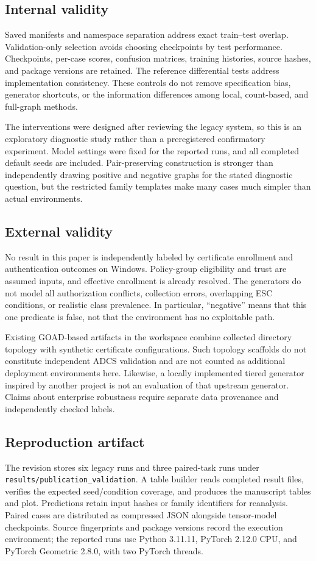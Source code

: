 \documentclass[journal]{IEEEtran}
\begin{document}
\subsection{Internal validity}
Saved manifests and namespace separation address exact train--test overlap. Validation-only selection avoids choosing checkpoints by test performance. Checkpoints, per-case scores, confusion matrices, training histories, source hashes, and package versions are retained. The reference differential tests address implementation consistency. These controls do not remove specification bias, generator shortcuts, or the information differences among local, count-based, and full-graph methods.

The interventions were designed after reviewing the legacy system, so this is an exploratory diagnostic study rather than a preregistered confirmatory experiment. Model settings were fixed for the reported runs, and all completed default seeds are included. Pair-preserving construction is stronger than independently drawing positive and negative graphs for the stated diagnostic question, but the restricted family templates make many cases much simpler than actual environments.

\subsection{External validity}
No result in this paper is independently labeled by certificate enrollment and authentication outcomes on Windows. Policy-group eligibility and trust are assumed inputs, and effective enrollment is already resolved. The generators do not model all authorization conflicts, collection errors, overlapping ESC conditions, or realistic class prevalence. In particular, ``negative'' means that this one predicate is false, not that the environment has no exploitable path.

Existing GOAD-based artifacts in the workspace combine collected directory topology with synthetic certificate configurations. Such topology scaffolds do not constitute independent ADCS validation and are not counted as additional deployment environments here. Likewise, a locally implemented tiered generator inspired by another project is not an evaluation of that upstream generator. Claims about enterprise robustness require separate data provenance and independently checked labels.

\subsection{Reproduction artifact}
The revision stores six legacy runs and three paired-task runs under \texttt{results/publication\_validation}. A table builder reads completed result files, verifies the expected seed/condition coverage, and produces the manuscript tables and plot. Predictions retain input hashes or family identifiers for reanalysis. Paired cases are distributed as compressed JSON alongside tensor-model checkpoints. Source fingerprints and package versions record the execution environment; the reported runs use Python 3.11.11, PyTorch 2.12.0 CPU, and PyTorch Geometric 2.8.0, with two PyTorch threads.
\end{document}

